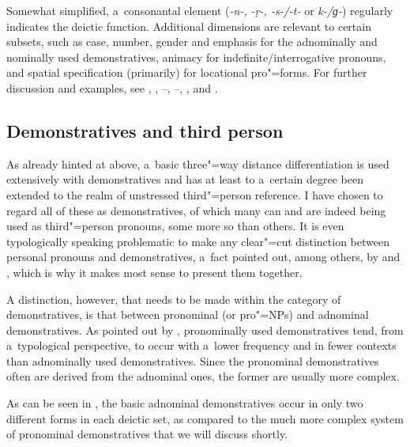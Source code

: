 Somewhat simplified, a~consonantal element (\textit{-n-, -ṛ-, -s-/-t-} or \textit{k-/ɡ-}) regularly indicates the deictic function. Additional dimensions are relevant to certain subsets, such as case, number, gender and emphasis for the adnominally and nominally used demonstratives, animacy for indefinite/interrogative pronouns, and spatial specification (primarily) for locational pro"=forms. For further discussion and examples, see , , --, --, ,  and .

\subsection{Demonstratives and third person}
\label{subsec:5-2-2}


As already hinted at above, a~basic three"=way distance differentiation is used extensively with demonstratives and has at least to a~certain degree been extended to the realm of unstressed third"=person reference. I have chosen to regard all of these as demonstratives, of which many can and are indeed being used as third"=person pronouns, some more so than others. It is even typologically speaking problematic to make any clear"=cut distinction between personal pronouns and demonstratives, a~fact pointed out, among others, by \citet[206]{himmelmann1996} and \citet[123--124]{kibrik2011}, which is why it makes most sense to present them together.



A distinction, however, that needs to be made within the category of demonstratives, is that between pronominal (or pro"=NPs) and adnominal demonstratives. As pointed out by \citet[206]{himmelmann1996}, pronominally used demonstratives tend, from a~typological perspective, to occur with a~lower frequency and in fewer contexts than adnominally used demonstratives. Since the pronominal demonstratives often are derived from the adnominal ones, the former are usually more complex. 



As can be seen in , the basic adnominal demonstratives occur in only two different forms in each deictic set, as compared to the much more complex system of pronominal demonstratives that we will discuss shortly. 



